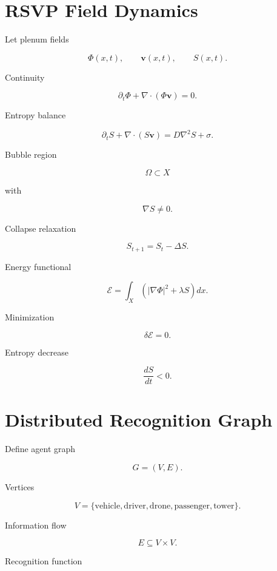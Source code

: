 \documentclass[11pt]{article}
\begin{document}

\section{RSVP Field Dynamics}

Let plenum fields

\[
\Phi(x,t), \qquad
\mathbf{v}(x,t), \qquad
S(x,t).
\]

Continuity

\[
\partial_t \Phi + \nabla \cdot (\Phi \mathbf{v}) = 0.
\]

Entropy balance

\[
\partial_t S
+
\nabla \cdot (S \mathbf{v})
=
D\nabla^2 S
+
\sigma.
\]

Bubble region

\[
\Omega \subset X
\]

with

\[
\nabla S \neq 0.
\]

Collapse relaxation

\[
S_{t+1}
=
S_t - \Delta S.
\]

Energy functional

\[
\mathcal{E}
=
\int_X
\left(
|\nabla \Phi|^2
+
\lambda S
\right)
dx.
\]

Minimization

\[
\delta \mathcal{E} = 0.
\]

Entropy decrease

\[
\frac{dS}{dt} < 0.
\]


\section{Distributed Recognition Graph}

Define agent graph

\[
G = (V,E).
\]

Vertices

\[
V =
\{\text{vehicle},\text{driver},\text{drone},\text{passenger},\text{tower}\}.
\]

Information flow

\[
E \subseteq V \times V.
\]

Recognition function
\end{document}
